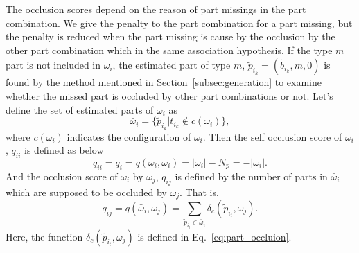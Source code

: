 \documentclass[10pt,twocolumn,letterpaper]{article}
\begin{document}
The occlusion scores depend on the reason of part missings in the part combination.
We give the penalty to the part combination for a part missing, but the penalty is reduced when the part missing is cause by the occlusion by the other part combination which in the same association hypothesis.
If the type $m$ part is not included in $\omega_i$, the estimated part of type $m$, $\tilde{p}_{i_k} = (\tilde{b}_{i_k},m,0)$ is found by the method mentioned in Section~\ref{subsec:generation} to examine whether the missed part is occluded by other part combinations or not.
Let's define the set of estimated parts of $\omega_i$ as 
\begin{equation}
   \label{eq:estimated_part_set}
   \bar{\omega}_i = \{ \tilde{p}_{i_k} | t_{i_k} \notin c(\omega_i) \},
\end{equation}
where $c(\omega_i)$ indicates the configuration of $\omega_i$.
Then the self occlusion score of $\omega_i$, $q_{ii}$ is defined as below
\begin{equation}
   \label{eq:missing_score}
   q_{ii} = q_i = q(\bar{\omega}_i, \omega_i) = |\omega_i| - N_p = - |\bar{\omega}_i|.
\end{equation}
And the occlusion score of $\omega_i$ by $\omega_j$, $q_{ij}$ is defined by the number of parts in $\bar{\omega}_i$ which are supposed to be occluded by $\omega_j$. 
That is,
\begin{equation}
   \label{eq:covering_score}
   q_{ij} = q(\bar{\omega}_i, \omega_j) = \sum_{\tilde{p}_{i_t} \in \bar{\omega}_i} \delta_c(\tilde{p}_{i_t}, \omega_j).
\end{equation}
Here, the function $\delta_c(\tilde{p}_{i_t}, \omega_j)$ is defined in Eq.~\ref{eq:part_occluion}.
\end{document}
